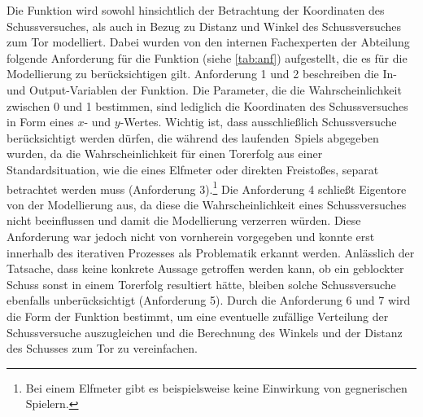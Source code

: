 Die Funktion wird sowohl hinsichtlich der Betrachtung der Koordinaten des Schussversuches, als auch in Bezug zu Distanz und Winkel des Schussversuches zum Tor modelliert. Dabei wurden von den internen Fachexperten der Abteilung folgende Anforderung für die Funktion (siehe \vref{tab:anf}) aufgestellt, die es für die Modellierung zu berücksichtigen gilt. Anforderung \textsf{1} und \textsf{2} beschreiben die In- und Output-Variablen der Funktion. Die Parameter, die die Wahrscheinlichkeit zwischen 0 und 1 bestimmen, sind lediglich die Koordinaten des Schussversuches in Form eines $x$- und $y$-Wertes. Wichtig ist, dass ausschließlich Schussversuche berücksichtigt werden dürfen, die während des \glqq laufenden\grqq~Spiels abgegeben wurden, da die Wahrscheinlichkeit für einen Torerfolg aus einer Standardsituation, wie die eines Elfmeter oder direkten Freistoßes, separat betrachtet werden muss (Anforderung \textsf{3}).\footnote{Bei einem Elfmeter gibt es beispielsweise keine Einwirkung von gegnerischen Spielern.} Die Anforderung \textsf{4} schließt Eigentore von der Modellierung aus, da diese die Wahrscheinlichkeit eines Schussversuches nicht beeinflussen und damit die Modellierung verzerren würden. Diese Anforderung war jedoch nicht von vornherein vorgegeben und konnte erst innerhalb des iterativen Prozesses als Problematik erkannt werden. Anlässlich der Tatsache, dass keine konkrete Aussage getroffen werden kann, ob ein geblockter Schuss sonst in einem Torerfolg resultiert hätte, bleiben solche Schussversuche ebenfalls unberücksichtigt (Anforderung \textsf{5}). Durch die Anforderung \textsf{6} und \textsf{7} wird die Form der Funktion bestimmt, um eine eventuelle zufällige Verteilung der Schussversuche auszugleichen und die Berechnung des Winkels und der Distanz des Schusses zum Tor zu vereinfachen.

